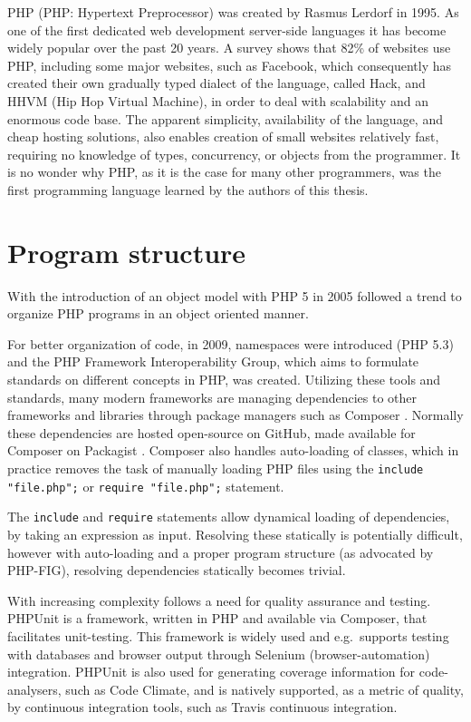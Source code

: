 PHP (PHP: Hypertext Preprocessor) was created by Rasmus Lerdorf in 1995. As one of the first dedicated web development server-side languages it has become widely popular over the past 20 years. A survey shows that 82\% of websites use PHP, including some major websites, such as Facebook, which consequently has created their own gradually typed dialect of the language, called Hack, and HHVM (Hip Hop Virtual Machine), in order to deal with scalability and an enormous code base. The apparent simplicity, availability of the language, and cheap hosting solutions,  also enables creation of small websites relatively fast, requiring no knowledge of types, concurrency, or objects from the programmer. It is no wonder why PHP, as it is the case for many other programmers, was the first programming language learned by the authors of this thesis.

\section{Program structure}
\label{sec:bgProgStuc}
With the introduction of an object model with PHP 5 in 2005 followed a trend to organize PHP programs in an object oriented manner. 

For better organization of code, in 2009, namespaces were introduced (PHP 5.3) and the PHP Framework Interoperability Group, which aims to formulate standards on different concepts in PHP, was created. Utilizing these tools and standards, many modern frameworks are managing dependencies to other frameworks and libraries through package managers such as Composer . Normally these dependencies are hosted open-source on GitHub, made available for Composer on Packagist . Composer also handles auto-loading of classes, which in practice removes the task of manually loading PHP files using the \texttt{include "file.php";} or \texttt{require "file.php";} statement. 

The \texttt{include} and \texttt{require} statements allow dynamical loading of dependencies, by taking an expression as input. Resolving these statically is potentially difficult, however with auto-loading and a proper program structure (as advocated by PHP-FIG), resolving dependencies statically becomes trivial.

With increasing complexity follows a need for quality assurance and testing. PHPUnit is a framework, written in PHP and available via Composer, that facilitates unit-testing. This framework is widely used and e.g.\ supports testing with databases and browser output through Selenium (browser-automation) integration. PHPUnit is also used for generating coverage information for code-analysers, such as Code Climate, and is natively supported, as a metric of quality, by continuous integration tools, such as Travis continuous integration. 

